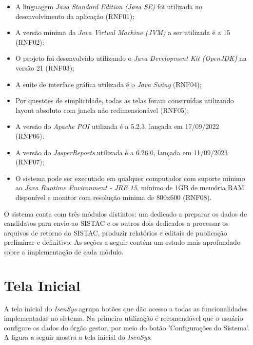 \documentclass[
	12pt,			%
	openright,		%
	oneside,	
	a4paper,		%
	english,		%
	brazil			%
]{abntex2/abntex2}  %
\begin{document}
		\begin{itemize}
			
			\item A linguagem \textit{Java Standard Edition (Java SE)} foi utilizada no desenvolvimento da aplicação (RNF01);
			\item A versão mínima da \textit{Java Virtual Machine (JVM)} a ser utilizada é a 15 (RNF02);
			\item O projeto foi desenvolvido utilizando o \textit{Java Development Kit (OpenJDK)} na versão 21 (RNF03);
			\item A suíte de interface gráfica utilizada é o \textit{Java Swing} (RNF04);
			\item Por questões de simplicidade, todas as telas foram construídas utilizando layout absoluto com janela não redimensionável (RNF05);
			\item A versão do \textit{Apache POI} utilizada é a 5.2.3, lançada em 17/09/2022 (RNF06);
			\item A versão do \textit{JasperReports\textregistered} utilizada é a 6.26.0, lançada em 11/09/2023 (RNF07);
			\item O sistema pode ser executado em qualquer computador com suporte mínimo ao \textit{Java Runtime Environment - JRE 15}, mínimo de 1GB de memória RAM disponível e monitor com resolução mínima de 800x600 (RNF08).
			
		\end{itemize}
	
		O sistema conta com três módulos distintos: um dedicado a preparar os dados de candidatos para envio ao SISTAC e os outros dois dedicados a processar os arquivos de retorno do SISTAC, produzir relatórios e editais de publicação preliminar e definitivo. As seções a seguir contém um estudo mais aprofundado sobre a implementação de cada módulo.

		\section{Tela Inicial}
		
			A tela inicial do \textit{IsenSys} agrupa botões que dão acesso a todas as funcionalidades implementadas no sistema. Na primeira utilização é recomendável que o usuário configure os dados do órgão gestor, por meio do botão 'Configurações do Sistema'. A figura a seguir mostra a tela inicial do \textit{IsenSys}.
			
\end{document}
